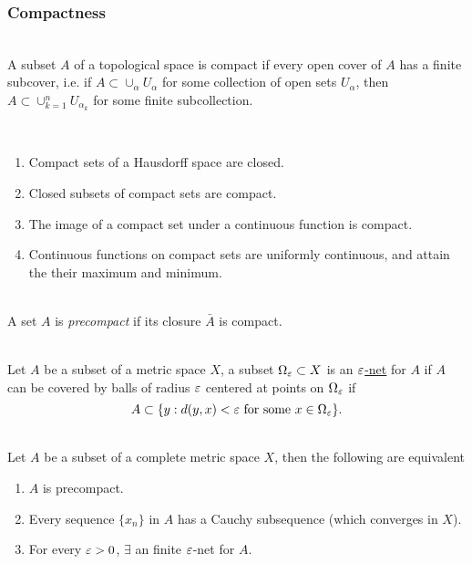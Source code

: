 \vspace{12pt}
\subsubsection{Compactness}

\begin{definition}[Compactness]\ \\
A subset $A$ of a topological space is compact if every open cover of $A$ has a finite subcover, i.e. if $A \subset \cup_{\alpha} U_\alpha$ for some collection of open sets $U_\alpha$, then $A \subset \cup_{k=1}^n U_{\alpha_k}$ for some finite subcollection.
\end{definition}

\vspace{3pt}
\begin{proposition}\ 
\begin{enumerate}[label = (\alph*)]
    \item Compact sets of a Hausdorff space are closed.
    \item Closed subsets of compact sets are compact.
    \item The image of a compact set under a continuous function is compact.
    \item Continuous functions on compact sets are uniformly continuous, and attain the their maximum and minimum.
\end{enumerate}
\end{proposition}


\vspace{3pt}
\begin{definition}\ \\
A set $A$ is \textit{precompact} if its closure $\bar{A}$ is compact.
\end{definition}

\vspace{3pt}
\begin{definition}\ \\
Let $A$ be a subset of a metric space $X$, a subset $\Omega_{\varepsilon} \subset X$ is an \underline{$\varepsilon$-net} for $A$ if $A$ can be covered by balls of radius $\varepsilon$ centered at points on $\Omega_\varepsilon$ if
\begin{equation*}
    A \subset \{y: d(y,x) < \varepsilon \text{ for some } x \in \Omega_\varepsilon\}.
\end{equation*}
\end{definition}


\vspace{3pt}
\begin{theorem}\ \\
Let $A$ be a subset of a complete metric space $X$, then the following are equivalent
\begin{enumerate}[label = (\alph*)]
    \item $A$ is precompact.
    \item Every sequence $\{x_n\}$ in $A$ has a Cauchy subsequence (which converges in $X$).
    \item For every $\varepsilon > 0$, $\exists$ an finite $\varepsilon$-net for $A$.
\end{enumerate}
\end{theorem}


